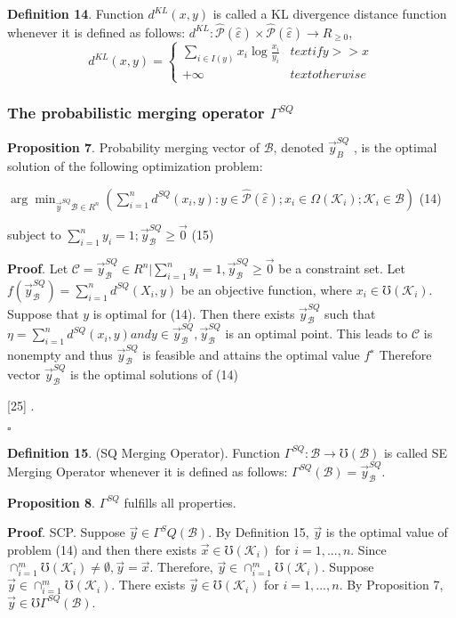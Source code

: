 \documentclass[10pt,a4paper]{IOS-Book-Article}
\begin{document}
\textbf{Definition 14}. Function $d^{KL}(x, y)$ is called a KL divergence distance function whenever it is defined as follows: $d^{KL} : \hat{\mathcal{P}} (\hat{\varepsilon}) \times \hat{\mathcal{P}} (\hat{\varepsilon}) \to R_{\geq0}$, $$d^{KL}(x, y) =
\begin{cases}
	\sum_{i \in I(y)} {x_i \log{\frac{x_i}{y_i}}} &text{if} y >> x \\
	+\infty 	&text{otherwise}
\end{cases}
$$

\subsubsection{The probabilistic merging operator $\Gamma^{SQ}$}

\textbf{Proposition 7}. Probability merging vector of $\mathcal{B}$, denoted $\vec{y}^{SQ}_B$ , is the optimal solution of the following optimization problem:

$\arg \min_{\vec{y}^{SQ}\mathcal{B} \in R^n}\left( \sum^n_{i=1} d^{SQ}(x_i, y) : y \in \hat{\mathcal{P}} (\hat{\varepsilon});x_i \in \Omega(\mathcal{K}_i);\mathcal{K}_i \in \mathcal{B} \right)$ (14)

subject to $\sum^n_{i=1}y_i = 1;\vec{y}^{SQ}_\mathcal{B} \geq \vec{0}$ (15)

\textbf{Proof}. Let $\mathcal{C} = {\vec{y}^{SQ}_\mathcal{B} \in R^n | \sum^n_{i=1}  y_i = 1, \vec{y}^{SQ}_\mathcal{B} \geq \vec{0}}$ be a constraint set. Let $f(\vec{y}^{SQ}_\mathcal{B} ) = \sum^n_{i=1} d^{SQ}(X_i, y)$ be an objective function, where $x_i \in \mho(\mathcal{K}_i)$. Suppose that $y$ is optimal for (14). Then there exists $\vec{y}^{SQ}_\mathcal{B}$ such that $\eta = \sum^n_{i=1} d^{SQ}(x_i, y) and y \in \vec{y}^{SQ}_\mathcal{B} , \vec{y}^{SQ}_\mathcal{B}$ is an optimal point. This leads to $\mathcal{C}$ is nonempty and thus $\vec{y}^{SQ}_\mathcal{B}$ is feasible and attains the optimal value $f^∗$ Therefore vector $\vec{y}^{SQ}_\mathcal{B}$ is the optimal solutions of (14)

[25] .

$\square$

\textbf{Definition 15}. (SQ Merging Operator). Function $\Gamma^{SQ} : \mathcal{B} \to \mho (\mathcal{B})$ is called SE Merging Operator whenever it is defined as follows: 
$\Gamma^{SQ}(\mathcal{B}) = \vec{y}^{SQ}_\mathcal{B}$.

\textbf{Proposition 8}. $\Gamma^{SQ}$ fulfills all properties.

\textbf{Proof}. SCP. Suppose $\vec{y} \in \Gamma^SQ(\mathcal{B})$. By Definition 15, $\vec{y}$ is the optimal value of problem (14) and then there exists $\vec{x} \in \mho(\mathcal{K}_i)$ for $i = 1, ... , n$. Since $\cap^m_{i=1}\mho(\mathcal{K}_i) \neq \emptyset, \vec{y} = \vec{x}$. Therefore, $\vec{y} \in \cap^m_{i=1}\mho(\mathcal{K}_i)$. Suppose $\vec{y} \in \cap^m_{i=1}\mho(\mathcal{K}_i)$. There exists $\vec{y} \in \mho(\mathcal{K}_i)$ for $i = 1, ... , n$. By Proposition 7, $\vec{y} \in \mho\Gamma^{SQ}(\mathcal{B})$.
\end{document}
